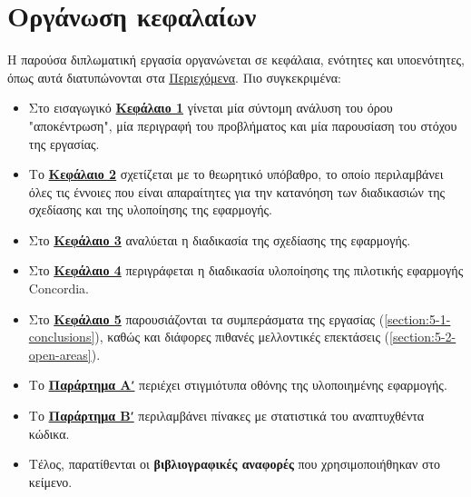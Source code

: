\section{Οργάνωση κεφαλαίων}\label{section:1-7-document-structure}

Η παρούσα διπλωματική εργασία οργανώνεται σε κεφάλαια, ενότητες και υποενότητες, όπως αυτά διατυπώνονται στα \hyperref[toc]{Περιεχόμενα}. Πιο συγκεκριμένα:

\begin{itemize}
	\item Στο εισαγωγικό \hyperref[chapter:1-introduction]{\textbf{Κεφάλαιο 1}} γίνεται μία σύντομη ανάλυση του όρου "αποκέντρωση", μία περιγραφή του προβλήματος και μία παρουσίαση του στόχου της εργασίας.
	\item Το \hyperref[chapter:2-theoretical-background]{\textbf{Κεφάλαιο 2}} σχετίζεται με το θεωρητικό υπόβαθρο, το οποίο περιλαμβάνει όλες τις έννοιες που είναι απαραίτητες για την κατανόηση των διαδικασιών της σχεδίασης και της υλοποίησης της εφαρμογής.
	\item Στο \hyperref[chapter:3-application-design]{\textbf{Κεφάλαιο 3}} αναλύεται η διαδικασία της σχεδίασης της εφαρμογής.
	\item Στο \hyperref[chapter:4-application-implementation]{\textbf{Κεφάλαιο 4}} περιγράφεται η διαδικασία υλοποίησης της πιλοτικής εφαρμογής Concordia.
	\item Στο \hyperref[chapter:5-conclusions-open-areas]{\textbf{Κεφάλαιο 5}} παρουσιάζονται τα συμπεράσματα της εργασίας (\ref{section:5-1-conclusions}), καθώς και διάφορες πιθανές μελλοντικές επεκτάσεις (\ref{section:5-2-open-areas}).
	\item Το \hyperref[{appendix-a}]{\textbf{Παράρτημα Αʹ}} περιέχει στιγμιότυπα οθόνης της υλοποιημένης εφαρμογής.
	\item Το \hyperref[{appendix-b}]{\textbf{Παράρτημα Βʹ}} περιλαμβάνει πίνακες με στατιστικά του αναπτυχθέντα κώδικα.
	\item Τέλος, παρατίθενται οι \textbf{βιβλιογραφικές αναφορές} που χρησιμοποιήθηκαν στο κείμενο.
\end{itemize}
